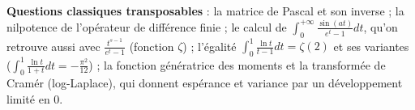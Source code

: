 \documentclass[11pt,a4paper]{article}
\begin{document}
\textbf{Questions classiques transposables} : la matrice de Pascal et son inverse ; la nilpotence de l'opérateur de différence finie ; le calcul de \(\int_0^{+\infty}\frac{\sin(at)}{e^t-1}dt\), qu'on retrouve aussi avec \(\frac{t^{s-1}}{e^t-1}\) (fonction \(\zeta\)) ; l'égalité \(\int_0^1\frac{\ln t}{t-1}dt=\zeta(2)\) et ses variantes (\(\int_0^1\frac{\ln t}{1+t}dt=-\frac{\pi^2}{12}\)) ; la fonction génératrice des moments et la transformée de Cramér (log-Laplace), qui donnent espérance et variance par un développement limité en \(0\).
\end{document}
